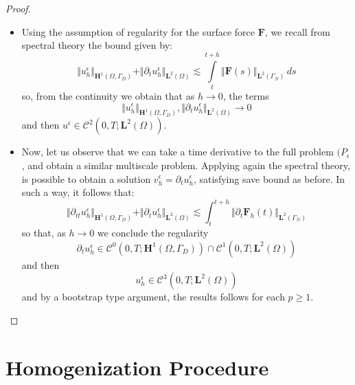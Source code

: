 \begin{proof}
\begin{itemize}
    
    \item Using the assumption of regularity for the surface force $\mathbf{F}$, we recall from spectral theory the bound given by:
    \begin{equation*}
        \Vert u_h^{\epsilon} \Vert_{\mathbf{H}^1(\Omega, \Gamma_D)} + \Vert \partial_t u_h^{\epsilon}\Vert_{\mathbf{L}^2(\Omega)} \lesssim \int \limits_t^{t+h} \Vert \mathbf{F}(s) \Vert_{\mathbf{L}^2(\Gamma_N)} \, ds
    \end{equation*}
    so, from the continuity we obtain that as $h \rightarrow 0$, the terms 
    \begin{equation*}
        \Vert u_h^{\epsilon} \Vert_{\mathbf{H}^1(\Omega, \Gamma_D)}, \Vert \partial_t u_h^{\epsilon} \Vert_{\mathbf{L}^2 (\Omega)} \rightarrow 0
    \end{equation*}
    and then $u^{\epsilon} \in \mathcal{C}^2(0,T; \mathbf{L}^2(\Omega))$.
    
    
    \item Now, let us observe that we can take a time derivative to the full problem $(P_{\epsilon}$, and obtain a similar multiscale problem. Applying again the spectral theory, is possible to obtain a solution $v_h^{\epsilon} = \partial_t u_h^{\epsilon}$, satisfying save bound as before. In such a way, it follows that:
    \begin{equation*}
        \Vert \partial_{tt} u_h^{\epsilon} \Vert_{\mathbf{H}^1(\Omega, \Gamma_D)} + \Vert \partial_t u_h^{\epsilon} \Vert_{\mathbf{L}^2 (\Omega)} \lesssim \int_t^{t+h} \Vert \partial_t \mathbf{F}_h(t) \Vert_{\mathbf{L}^2(\Gamma_N)}
    \end{equation*}
    so that, as $h \rightarrow 0$ we conclude the regularity
    \begin{equation*}
        \partial_t u_h^{\epsilon} \in \mathcal{C}^0(0,T;\mathbf{H}^1(\Omega, \Gamma_D)) \cap \mathcal{C}^1(0,T;\mathbf{L}^2(\Omega)) 
    \end{equation*}
    and then
    \begin{equation*}
        u_h^{\epsilon} \in \mathcal{C}^3(0,T; \mathbf{L}^2(\Omega))
    \end{equation*}
    and by a bootstrap type argument, the results follows for each $p \geq 1$.
\end{itemize}

\end{proof}



\section{Homogenization Procedure}

